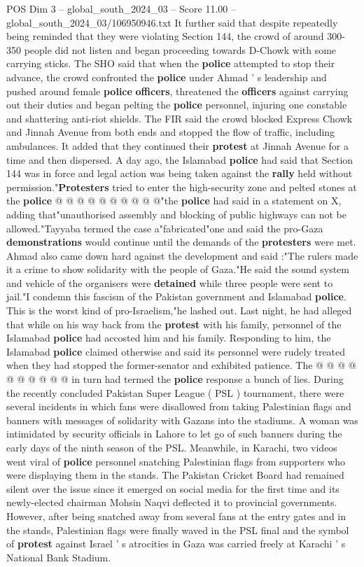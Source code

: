 \begin{textsample}{POS Dim 3 – global\_south\_2024\_03 – Score 11.00 – global\_south\_2024\_03/106950946.txt}
It further said that despite repeatedly being reminded that they were violating Section 144, the crowd of around 300-350 people did not listen and began proceeding towards D-Chowk with some carrying sticks.
The SHO said that when the \textbf{police} attempted to stop their advance, the crowd confronted the \textbf{police} under Ahmad ' s leadership and pushed around female \textbf{police} \textbf{officers}, threatened the \textbf{officers} against carrying out their duties and began pelting the \textbf{police} personnel, injuring one constable and shattering anti-riot shields.
The FIR said the crowd blocked Express Chowk and Jinnah Avenue from both ends and stopped the flow of traffic, including ambulances.
It added that they continued their \textbf{protest} at Jinnah Avenue for a time and then dispersed.
A day ago, the Islamabad \textbf{police} had said that Section 144 was in force and legal action was being taken against the \textbf{rally} held without permission."\textbf{Protesters} tried to enter the high-security zone and pelted stones at the \textbf{police} @ @ @ @ @ @ @ @ @ @"the \textbf{police} had said in a statement on X, adding that"unauthorised assembly and blocking of public highways can not be allowed."Tayyaba termed the case a"fabricated"one and said the pro-Gaza \textbf{demonstrations} would continue until the demands of the \textbf{protesters} were met.
Ahmad also came down hard against the development and said :"The rulers made it a crime to show solidarity with the people of Gaza."He said the sound system and vehicle of the organisers were \textbf{detained} while three people were sent to jail."I condemn this fascism of the Pakistan government and Islamabad \textbf{police}.
This is the worst kind of pro-Israelism,"he lashed out.
Last night, he had alleged that while on his way back from the \textbf{protest} with his family, personnel of the Islamabad \textbf{police} had accosted him and his family.
Responding to him, the Islamabad \textbf{police} claimed otherwise and said its personnel were rudely treated when they had stopped the former-senator and exhibited patience.
The @ @ @ @ @ @ @ @ @ @ in turn had termed the \textbf{police} response a bunch of lies.
During the recently concluded Pakistan Super League ( PSL ) tournament, there were several incidents in which fans were disallowed from taking Palestinian flags and banners with messages of solidarity with Gazans into the stadiums.
A woman was intimidated by security officials in Lahore to let go of such banners during the early days of the ninth season of the PSL.
Meanwhile, in Karachi, two videos went viral of \textbf{police} personnel snatching Palestinian flags from supporters who were displaying them in the stands.
The Pakistan Cricket Board had remained silent over the issue since it emerged on social media for the first time and its newly-elected chairman Mohsin Naqvi deflected it to provincial governments.
However, after being snatched away from several fans at the entry gates and in the stands, Palestinian flags were finally waved in the PSL final and the symbol of \textbf{protest} against Israel ' s atrocities in Gaza was carried freely at Karachi ' s National Bank Stadium.


\end{textsample}
